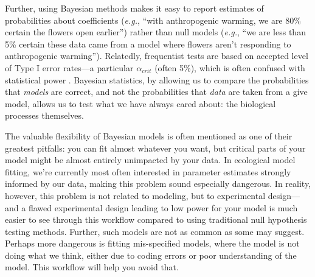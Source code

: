 \documentclass[11pt]{article}
\begin{document}
{%
Further, using Bayesian methods makes it easy to report estimates of probabilities about coefficients (\emph{e.g.}, ``with anthropogenic warming, we are 80\% certain the flowers open earlier'') rather than null models (\emph{e.g.}, ``we are less than 5\% certain these data came from a model where flowers aren't responding to anthropogenic warming''). Relatedly, frequentist tests are based on accepted level of Type I error rates---a particular $\alpha_{crit}$ (often 5\%), which is often confused with statistical power  \citep[$\beta$, the probability that we would detect a true effect is dependent on, but separate from $alpha_{crit}$, indeed statistical power is often extremely low in ecological studies,][]{jennions2003survey}. Bayesian statistics, by allowing us to compare the probabilities that \emph{models} are correct, and not the probabilities that \emph{data} are taken from a give model, allows us to test what we have always cared about: the biological processes themselves.

The valuable flexibility of Bayesian models is often mentioned as one of their greatest pitfalls: you can fit almost whatever you want, but critical parts of your model might be almost entirely unimpacted by your data. In ecological model fitting, we're currently most often interested in parameter estimates strongly informed by our data, making this problem sound especially dangerous. In reality, however, this problem is not related to modeling, but to experimental design---and a flawed experimental design leading to low power for your model is much easier to see through this workflow compared to using traditional null hypothesis testing methods. Further, such models are not as common as some may suggest. Perhaps more dangerous is fitting mis-specified models, where the model is not doing what we think, either due to coding errors or poor understanding of the model. This workflow will help you avoid that. %

}
\end{document}
